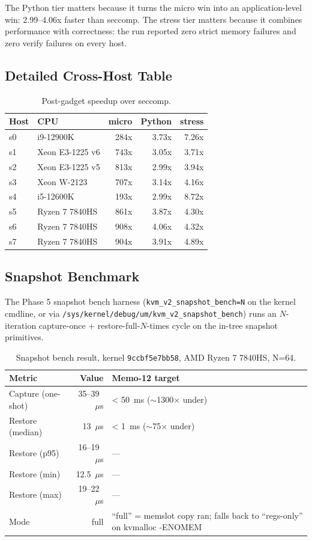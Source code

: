 The Python tier matters because it turns the micro win into an
application-level win: 2.99--4.06x faster than seccomp. The stress
tier matters because it combines performance with correctness: the
run reported zero strict memory failures and zero verify failures on
every host.

\subsection{Detailed Cross-Host Table}

\begin{table}[h]
\centering
\caption{Post-gadget speedup over seccomp.}
\small
\begin{tabular}{@{}llrrr@{}}
\toprule
Host & CPU & micro & Python & stress \\
\midrule
s0 & i9-12900K & 284x & 3.73x & 7.26x \\
s1 & Xeon E3-1225 v6 & 743x & 3.05x & 3.71x \\
s2 & Xeon E3-1225 v5 & 813x & 2.99x & 3.94x \\
s3 & Xeon W-2123 & 707x & 3.14x & 4.16x \\
s4 & i5-12600K & 193x & 2.99x & 8.72x \\
s5 & Ryzen 7 7840HS & 861x & 3.87x & 4.30x \\
s6 & Ryzen 7 7840HS & 908x & 4.06x & 4.32x \\
s7 & Ryzen 7 7840HS & 904x & 3.91x & 4.89x \\
\bottomrule
\end{tabular}
\end{table}

\subsection{Snapshot Benchmark}

The Phase 5 snapshot bench harness (\texttt{kvm\_v2\_snapshot\_bench=N}
on the kernel cmdline, or via \texttt{/sys/kernel/debug/um/kvm\_v2\_snapshot\_bench})
runs an $N$-iteration capture-once + restore-full-$N$-times cycle
on the in-tree \KVMvTwo{} snapshot primitives.

\begin{table}[h]
\centering
\caption{Snapshot bench result, kernel \texttt{9ccbf5e7bb58}, AMD Ryzen 7 7840HS, N=64.}
\small
\begin{tabular}{@{}lrl@{}}
\toprule
Metric & Value & Memo-12 target \\
\midrule
Capture (one-shot) & 35--39~$\mu$s & < 50~ms ($\sim$1300$\times$ under) \\
Restore (median) & 13~$\mu$s & < 1~ms ($\sim$75$\times$ under) \\
Restore (p95) & 16--19~$\mu$s & --- \\
Restore (min) & 12.5~$\mu$s & --- \\
Restore (max) & 19--22~$\mu$s & --- \\
Mode & full & ``full'' = memslot copy ran; falls back to ``regs-only'' on kvmalloc -ENOMEM \\
\bottomrule
\end{tabular}
\end{table}

